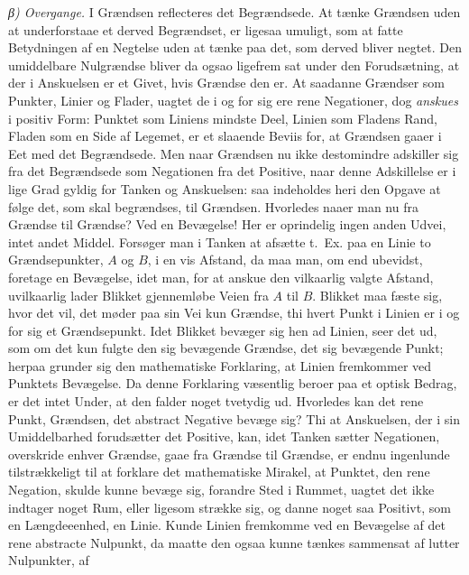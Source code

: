 \documentclass[12pt,a4paper]{book}
\begin{document}
\emph{β) Overgange.} I Grændsen reflecteres det Begrændsede.
At tænke Grændsen uden at underforstaae et
derved Begrændset, er ligesaa umuligt, som at fatte Betydningen
af en Negtelse uden at tænke paa det, som derved
bliver negtet. Den umiddelbare Nulgrændse bliver da ogsao
ligefrem sat under den Forudsætning, at der i Anskuelsen er
et Givet, hvis Grændse den er. At saadanne Grændser som
Punkter, Linier og Flader, uagtet de i og for sig ere rene
Negationer, dog \emph{anskues} i positiv Form: Punktet som
Liniens mindste Deel, Linien som Fladens Rand, Fladen
som en Side af Legemet, er et slaaende Beviis for, at
Grændsen gaaer i Eet med det Begrændsede. Men naar
Grændsen nu ikke destomindre adskiller sig fra det Begrændsede
som Negationen fra det Positive, naar denne Adskillelse
er i lige Grad gyldig for Tanken og Anskuelsen: saa
indeholdes heri den Opgave at følge det, som skal begrændses,
til Grændsen. Hvorledes naaer man nu fra Grændse til
Grændse? Ved en Bevægelse! Her er oprindelig ingen anden
Udvei, intet andet Middel. Forsøger man i Tanken at afsætte
t.~Ex. paa en Linie to Grændsepunkter, $A$ og $B$, i en
vis Afstand, da maa man, om end ubevidst, foretage en Bevægelse,
idet man, for at anskue den vilkaarlig valgte Afstand,
uvilkaarlig lader Blikket gjennemløbe Veien fra $A$ til $B$.
Blikket maa fæste sig, hvor det vil, det møder paa sin Vei
kun Grændse, thi hvert Punkt i Linien er i og for sig et
Grændsepunkt. Idet Blikket bevæger sig hen ad Linien, seer
det ud, som om det kun fulgte den sig bevægende Grændse,
det sig bevægende Punkt; herpaa grunder sig den mathematiske
Forklaring, at Linien fremkommer ved Punktets Bevægelse.
Da denne Forklaring væsentlig beroer paa et optisk
Bedrag, er det intet Under, at den falder noget tvetydig ud.
Hvorledes kan det rene Punkt, Grændsen, det abstract Negative
bevæge sig? Thi at Anskuelsen, der i sin Umiddelbarhed forudsætter
det Positive, kan, idet Tanken sætter Negationen,
overskride enhver Grændse, gaae fra Grændse til Grændse,
er endnu ingenlunde tilstrækkeligt til at forklare det mathematiske
Mirakel, at Punktet, den rene Negation, skulde kunne
bevæge sig, forandre Sted i Rummet, uagtet det ikke indtager noget
Rum, eller ligesom strække sig, og danne noget saa Positivt,
som en Længdeeenhed, en Linie. Kunde Linien fremkomme
\setcounter{footnote}{0}
ved en Bevægelse af det rene abstracte Nulpunkt, da maatte
den ogsaa kunne tænkes sammensat af lutter Nulpunkter, af
\end{document}
